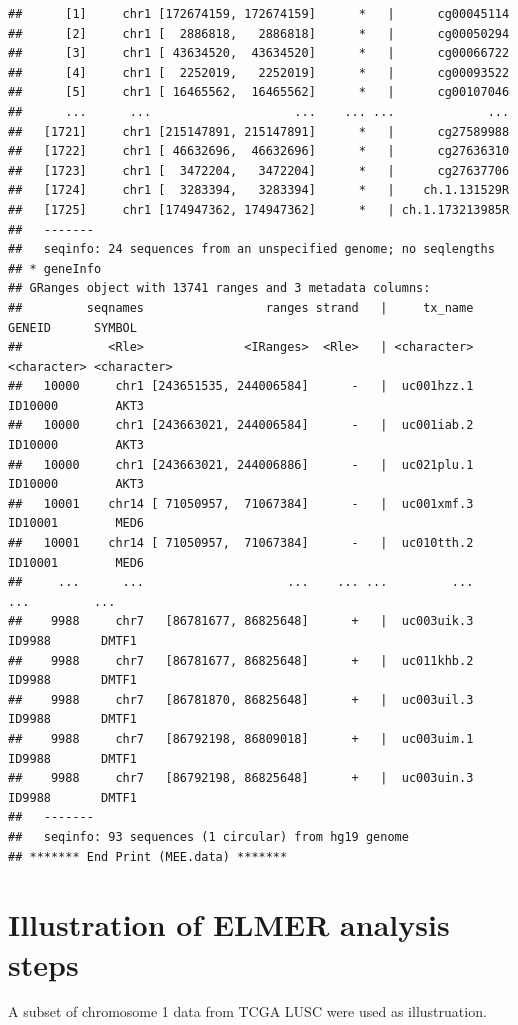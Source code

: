 \documentclass{article}\usepackage[]{graphicx}\usepackage[]{color}
\makeatletter
\newenvironment{kframe}{%
 \def\at@end@of@kframe{}%
 \ifinner\ifhmode%
  \def\at@end@of@kframe{\end{minipage}}%
  \begin{minipage}{\columnwidth}%
 \fi\fi%
 \def\FrameCommand##1{\hskip\@totalleftmargin \hskip-\fboxsep
 \colorbox{shadecolor}{##1}\hskip-\fboxsep
     \hskip-\linewidth \hskip-\@totalleftmargin \hskip\columnwidth}%
 \MakeFramed {\advance\hsize-\width
   \@totalleftmargin\z@ \linewidth\hsize
   \@setminipage}}%
 {\par\unskip\endMakeFramed%
 \at@end@of@kframe}
\newenvironment{knitrout}{}{} %
\makeatother
\begin{document}
\begin{knitrout}
\begin{kframe}
\begin{verbatim}
##      [1]     chr1 [172674159, 172674159]      *   |      cg00045114
##      [2]     chr1 [  2886818,   2886818]      *   |      cg00050294
##      [3]     chr1 [ 43634520,  43634520]      *   |      cg00066722
##      [4]     chr1 [  2252019,   2252019]      *   |      cg00093522
##      [5]     chr1 [ 16465562,  16465562]      *   |      cg00107046
##      ...      ...                    ...    ... ...             ...
##   [1721]     chr1 [215147891, 215147891]      *   |      cg27589988
##   [1722]     chr1 [ 46632696,  46632696]      *   |      cg27636310
##   [1723]     chr1 [  3472204,   3472204]      *   |      cg27637706
##   [1724]     chr1 [  3283394,   3283394]      *   |    ch.1.131529R
##   [1725]     chr1 [174947362, 174947362]      *   | ch.1.173213985R
##   -------
##   seqinfo: 24 sequences from an unspecified genome; no seqlengths
## * geneInfo 
## GRanges object with 13741 ranges and 3 metadata columns:
##         seqnames                 ranges strand   |     tx_name      GENEID      SYMBOL
##            <Rle>              <IRanges>  <Rle>   | <character> <character> <character>
##   10000     chr1 [243651535, 244006584]      -   |  uc001hzz.1     ID10000        AKT3
##   10000     chr1 [243663021, 244006584]      -   |  uc001iab.2     ID10000        AKT3
##   10000     chr1 [243663021, 244006886]      -   |  uc021plu.1     ID10000        AKT3
##   10001    chr14 [ 71050957,  71067384]      -   |  uc001xmf.3     ID10001        MED6
##   10001    chr14 [ 71050957,  71067384]      -   |  uc010tth.2     ID10001        MED6
##     ...      ...                    ...    ... ...         ...         ...         ...
##    9988     chr7   [86781677, 86825648]      +   |  uc003uik.3      ID9988       DMTF1
##    9988     chr7   [86781677, 86825648]      +   |  uc011khb.2      ID9988       DMTF1
##    9988     chr7   [86781870, 86825648]      +   |  uc003uil.3      ID9988       DMTF1
##    9988     chr7   [86792198, 86809018]      +   |  uc003uim.1      ID9988       DMTF1
##    9988     chr7   [86792198, 86825648]      +   |  uc003uin.3      ID9988       DMTF1
##   -------
##   seqinfo: 93 sequences (1 circular) from hg19 genome
## ******* End Print (MEE.data) *******
\end{verbatim}
\end{kframe}
\end{knitrout}

\section{Illustration of ELMER analysis steps}
A subset of chromosome 1 data from TCGA LUSC were used as illustruation. 
\end{document}
